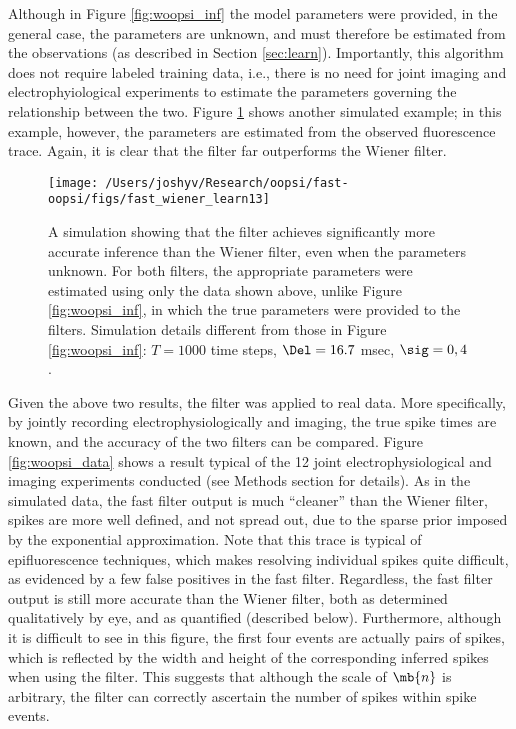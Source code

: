 Although in Figure \ref{fig:woopsi_inf} the model parameters were provided, in the general case, the parameters are unknown, and must therefore be estimated from the observations (as described in Section \ref{sec:learn}). Importantly, this algorithm does not require labeled training data, i.e., there is no need for joint imaging and electrophyiological experiments to estimate the parameters governing the relationship between the two.  Figure \ref{fig:woopsi_learn} shows another simulated example; in this example, however, the parameters are estimated from the observed fluorescence trace.  Again, it is clear that the \foopsi filter far outperforms the Wiener filter.

\begin{figure}[h!]
\centering \texttt{[image: /Users/joshyv/Research/oopsi/fast-oopsi/figs/fast\_wiener\_learn13]}
\caption[parameters may be estimated using the \foopsi filter]{A simulation showing that the \foopsi filter achieves significantly more accurate inference than the Wiener filter, even when the parameters unknown.  For both filters, the appropriate parameters were estimated using only the data shown above, unlike Figure \ref{fig:woopsi_inf}, in which the true parameters were provided to the filters. Simulation details different from those in Figure \ref{fig:woopsi_inf}: $T=1000$ time steps, $\Del=16.7$ msec, $\sig=0,4$.} \label{fig:woopsi_learn}
\end{figure}

Given the above two results, the \foopsi filter was applied to real data.  More specifically, by jointly recording electrophysiologically and imaging, the true spike times are known, and the accuracy of the two filters can be compared.  Figure \ref{fig:woopsi_data} shows a result typical of the 12 joint electrophysiological and imaging experiments conducted (see Methods section for details). As in the simulated data, the fast filter output is much ``cleaner'' than the Wiener filter, spikes are more well defined, and not spread out, due to the sparse prior imposed by the exponential approximation.  Note that this trace is typical of epifluorescence techniques, which makes resolving individual spikes quite difficult, as evidenced by a few false positives in the fast filter.  Regardless, the fast filter output is still more accurate than the Wiener filter, both as determined qualitatively by eye, and as quantified (described below).  Furthermore, although it is difficult to see in this figure, the first four events are actually pairs of spikes, which is reflected by the width and height of the corresponding inferred spikes when using the \foopsi filter. %
This suggests that although the scale of $\mb{n}$ is arbitrary, the \foopsi filter can correctly ascertain the number of spikes within spike events.  

